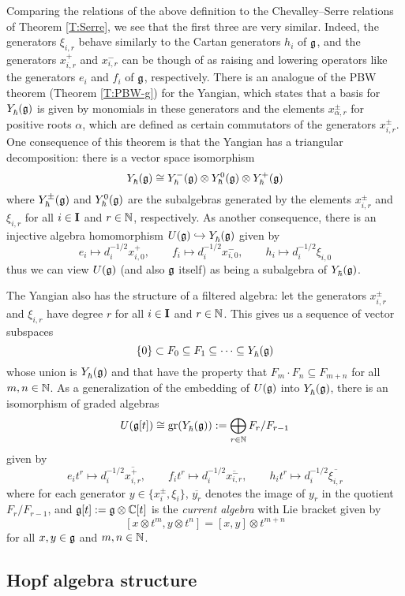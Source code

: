Comparing the relations of the above definition to the Chevalley--Serre relations of Theorem \ref{T:Serre}, we see that the first three are very similar.
Indeed, the generators $\xi_{i,r}$ behave similarly to the Cartan generators $h_i$ of $\g$, and the generators $x^+_{i,r}$ and $x^-_{i,r}$ can be though of as raising and lowering operators like the generators $e_i$ and $f_i$ of $\g$, respectively.
There is an analogue of the PBW theorem (Theorem \ref{T:PBW-g}) for the Yangian, which states that a basis for $\Yhg$ is given by monomials in these generators and the elements $x^\pm_{\alpha, r}$ for positive roots $\alpha$, which are defined as certain commutators of the generators $x^\pm_{i,r}$.
One consequence of this theorem is that the Yangian has a triangular decomposition: there is a vector space isomorphism
\[\Yhg \cong \Yhg[-]\otimes\Yhg[0]\otimes\Yhg[+]\]
where $\Yhg[\pm]$ and $\Yhg[0]$ are the subalgebras generated by the elements $x^\pm_{i,r}$ and $\xi_{i,r}$ for all $i\in\I$ and $r\in\N$, respectively.
As another consequence, there is an injective algebra homomorphism $\Ug\inj\Yhg$ given by
\[e_i\mapsto d_i^{-1/2}x^+_{i,0}, \qquad f_i\mapsto d_i^{-1/2}x^-_{i,0}, \qquad h_i\mapsto d_i^{-1/2}\xi_{i,0}\]
thus we can view $\Ug$ (and also $\g$ itself) as being a subalgebra of $\Yhg$.

The Yangian also has the structure of a filtered algebra: let the generators $x^\pm_{i,r}$ and $\xi_{i,r}$ have degree $r$ for all $i\in\I$ and $r\in\N$.
This gives us a sequence of vector subspaces
\[\{0\}\subset F_0\subseteq F_1\subseteq\cdots\subseteq \Yhg\]
whose union is $\Yhg$ and that have the property that $F_m\cdot F_n\subseteq F_{m+n}$ for all $m,n\in\N$.
As a generalization of the embedding of $\Ug$ into $\Yhg$, there is an isomorphism of graded algebras
\[U(\g[t]) \cong \gr(\Yhg) := \bigoplus_{r\in\N}F_r/F_{r-1}\]
given by
\[e_it^r\mapsto d_i^{-1/2}\overline{x^+_{i,r}}, \qquad f_it^r\mapsto d_i^{-1/2}\overline{x^-_{i,r}}, \qquad h_it^r\mapsto d_i^{-1/2}\overline{\xi_{i,r}}\]
where for each generator $y\in\{x^\pm_i,\xi_i\}$, $\overline{y_r}$ denotes the image of $y_r$ in the quotient $F_r/F_{r-1}$, and $\g[t] := \g\otimes\C[t]$ is the \emph{current algebra} with Lie bracket given by
\[[x\otimes t^m, y\otimes t^n] = [x,y]\otimes t^{m+n}\]
for all $x,y\in\g$ and $m,n\in\N$.


\subsection{Hopf algebra structure}\label{ssec:Y-Hopf}

